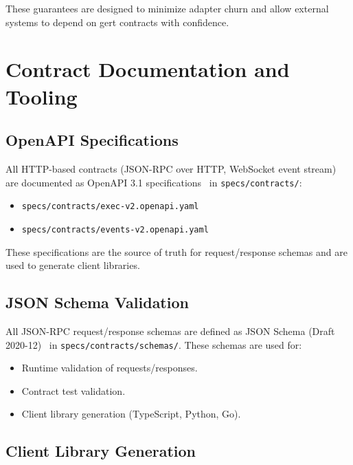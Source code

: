 These guarantees are designed to minimize adapter churn and allow external
systems to depend on gert contracts with confidence.

\section{Contract Documentation and Tooling}

\subsection{OpenAPI Specifications}

All HTTP-based contracts (JSON-RPC over HTTP, WebSocket event stream) are
documented as OpenAPI 3.1 specifications~\cite{openapi-spec} in
\texttt{specs/contracts/}:

\begin{itemize}
  \item \texttt{specs/contracts/exec-v2.openapi.yaml}
  \item \texttt{specs/contracts/events-v2.openapi.yaml}
\end{itemize}

These specifications are the source of truth for request/response schemas and
are used to generate client libraries.

\subsection{JSON Schema Validation}

All JSON-RPC request/response schemas are defined as JSON Schema (Draft
2020-12)~\cite{jsonschema-spec} in \texttt{specs/contracts/schemas/}.  These
schemas are used for:

\begin{itemize}
  \item Runtime validation of requests/responses.
  \item Contract test validation.
  \item Client library generation (TypeScript, Python, Go).
\end{itemize}

\subsection{Client Library Generation}

